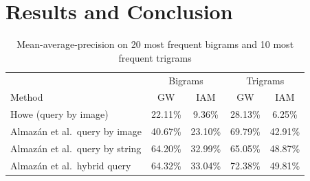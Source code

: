 \documentclass[conference]{IEEEtran}
\begin{document}
\section{Results and Conclusion}


\begin{table}
\caption{Mean-average-precision on 20 most frequent bigrams and 10 most frequent trigrams}
\begin{center}
\label{table:bigrams}
\begin{tabular}{@{}lcccc@{}}
\toprule
              &\multicolumn{2}{c}{Bigrams} & \multicolumn{2}{c}{Trigrams}\\ 
Method                         & GW      & IAM       & GW      & IAM     \\ \midrule
Howe (query by image)                & 22.11\% & 9.36\%    & 28.13\% & 6.25\%  \\ 
Almaz\'{a}n et al.~query by image     & 40.67\% & 23.10\%   & 69.79\% & 42.91\% \\
Almaz\'{a}n et al.~query by string    & 64.20\% & 32.99\%   & 65.05\% & 48.87\% \\ 
Almaz\'{a}n et al.~hybrid query       & 64.32\% & 33.04\%   & 72.38\% & 49.81\%  
\end{tabular}
\end{center}
\end{table}
\end{document}
